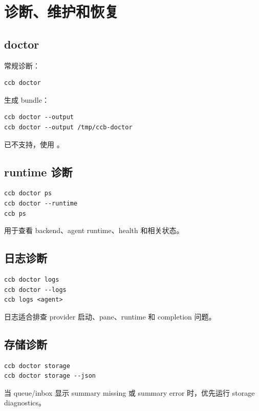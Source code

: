 \chapter{诊断、维护和恢复}

\section{doctor}

常规诊断：

\begin{lstlisting}
ccb doctor
\end{lstlisting}

生成 bundle：

\begin{lstlisting}
ccb doctor --output
ccb doctor --output /tmp/ccb-doctor
\end{lstlisting}

 已不支持，使用 。

\section{runtime 诊断}

\begin{lstlisting}
ccb doctor ps
ccb doctor --runtime
ccb ps
\end{lstlisting}

用于查看 backend、agent runtime、health 和相关状态。

\section{日志诊断}

\begin{lstlisting}
ccb doctor logs
ccb doctor --logs
ccb logs <agent>
\end{lstlisting}

日志适合排查 provider 启动、pane、runtime 和 completion 问题。

\section{存储诊断}

\begin{lstlisting}
ccb doctor storage
ccb doctor storage --json
\end{lstlisting}

当 queue/inbox 显示 summary missing 或 summary error 时，优先运行 storage diagnostics。

